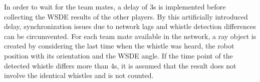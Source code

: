 In order to wait for the team mates,
a delay of 3\si{\second} is implemented before collecting the \ac{WSDE} results
of the other players.
By this artificially introduced delay, synchronization issues due to network lags and
whistle detection differences can be circumvented.
For each team mate available in the network, a ray object is created by considering the
last time when the whistle was heard, the robot position with its orientation and the \ac{WSDE} angle.
If the time point of the detected whistle differs more than 4\si{\second}, it is assumed that
the result does not involve the identical whistles and is not counted.

